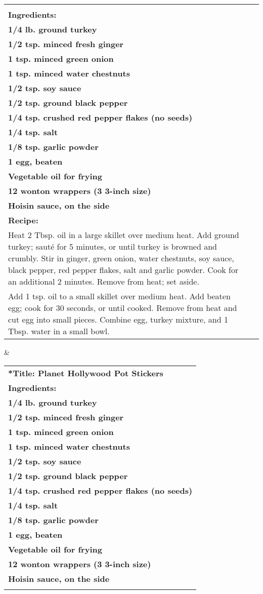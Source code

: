 \begin{table*}[]
\begin{tabular}{p{.5\linewidth}p{.5\linewidth}}
\begin{tabular}[c]{@{}p{\linewidth}@{}}\textbf{Title: Planet Hollywood Pot Stickers}\\ \textbf{ Ingredients:}\\ \textbf{ 1/4 lb. ground turkey}\\ \textbf{ 1/2 tsp. minced fresh ginger}\\ \textbf{ 1 tsp. minced green onion}\\ \textbf{ 1 tsp. minced water chestnuts}\\ \textbf{ 1/2 tsp. soy sauce}\\ \textbf{ 1/2 tsp. ground black pepper}\\ \textbf{ 1/4 tsp. crushed red pepper flakes (no seeds)}\\ \textbf{ 1/4 tsp. salt}\\ \textbf{ 1/8 tsp. garlic powder}\\ \textbf{ 1 egg, beaten}\\ \textbf{ Vegetable oil for frying}\\ \textbf{ 12 wonton wrappers (3 3-inch size)}\\ \textbf{ Hoisin sauce, on the side}\\ \textbf{ Recipe:}\\ Heat 2 Tbsp. oil in a large skillet over medium heat. Add ground turkey; sauté for 5 minutes, or until turkey is browned and crumbly. Stir in ginger, green onion, water chestnuts, soy sauce, black pepper, red pepper flakes, salt and garlic powder. Cook for an additional 2 minutes. Remove from heat; set aside.\\ Add 1 tsp. oil to a small skillet over medium heat. Add beaten egg; cook for 30 seconds, or until cooked. Remove from heat and cut egg into small pieces. Combine egg, turkey mixture, and 1 Tbsp. water in a small bowl.\end{tabular} & \begin{tabular}[c]{@{}p{\linewidth}@{}}\textbf{*Title: Planet Hollywood Pot Stickers}\\ \textbf{ Ingredients:}\\ \textbf{ 1/4 lb. ground turkey}\\ \textbf{ 1/2 tsp. minced fresh ginger}\\ \textbf{ 1 tsp. minced green onion}\\ \textbf{ 1 tsp. minced water chestnuts}\\ \textbf{ 1/2 tsp. soy sauce}\\ \textbf{ 1/2 tsp. ground black pepper}\\ \textbf{ 1/4 tsp. crushed red pepper flakes (no seeds)}\\ \textbf{ 1/4 tsp. salt}\\ \textbf{ 1/8 tsp. garlic powder}\\ \textbf{ 1 egg, beaten}\\ \textbf{ Vegetable oil for frying}\\ \textbf{ 12 wonton wrappers (3 3-inch size)}\\ \textbf{Hoisin sauce, on the side}\\ \textbf{ 
\end{tabular}
\end{table*}
